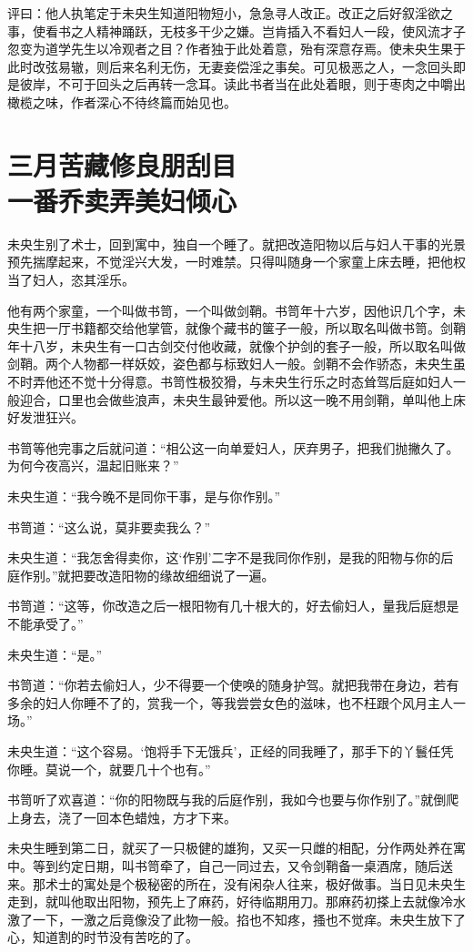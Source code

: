 \documentclass[a4paper,12pt,UTF8,twoside]{ctexbook}
\begin{document}
评曰：他人执笔定于未央生知道阳物短小，急急寻人改正。改正之后好叙淫欲之事，使看书之人精神踊跃，无枝多干少之嫌。岂肯插入不看妇人一段，使风流才子忽变为道学先生以冷观者之目？作者独于此处着意，殆有深意存焉。使未央生果于此时改弦易辙，则后来名利无伤，无妻妾偿淫之事矣。可见极恶之人，一念回头即是彼岸，不可于回头之后再转一念耳。读此书者当在此处着眼，则于枣肉之中嚼出橄榄之味，作者深心不待终篇而始见也。

\chapter[三月苦藏修良朋刮目\ 一番乔卖弄美妇倾心]{三月苦藏修良朋刮目\\一番乔卖弄美妇倾心}

未央生别了术士，回到寓中，独自一个睡了。就把改造阳物以后与妇人干事的光景预先揣摩起来，不觉淫兴大发，一时难禁。只得叫随身一个家童上床去睡，把他权当了妇人，恣其淫乐。

他有两个家童，一个叫做书笥，一个叫做剑鞘。书笥年十六岁，因他识几个字，未央生把一厅书籍都交给他掌管，就像个藏书的箧子一般，所以取名叫做书笥。剑鞘年十八岁，未央生有一口古剑交付他收藏，就像个护剑的套子一般，所以取名叫做剑鞘。两个人物都一样妖姣，姿色都与标致妇人一般。剑鞘不会作骄态，未央生虽不时弄他还不觉十分得意。书笥性极狡猾，与未央生行乐之时态耸驾后庭如妇人一般迎合，口里也会做些浪声，未央生最钟爱他。所以这一晚不用剑鞘，单叫他上床好发泄狂兴。

书笥等他完事之后就问道：“相公这一向单爱妇人，厌弃男子，把我们抛撇久了。为何今夜高兴，温起旧账来？”

未央生道：“我今晚不是同你干事，是与你作别。”

书笥道：“这么说，莫非要卖我么？”

未央生道：“我怎舍得卖你，这‘作别’二字不是我同你作别，是我的阳物与你的后庭作别。”就把要改造阳物的缘故细细说了一遍。

书笥道：“这等，你改造之后一根阳物有几十根大的，好去偷妇人，量我后庭想是不能承受了。”

未央生道：“是。”

书笥道：“你若去偷妇人，少不得要一个使唤的随身护驾。就把我带在身边，若有多余的妇人你睡不了的，赏我一个，等我尝尝女色的滋味，也不枉跟个风月主人一场。”

未央生道：“这个容易。‘饱将手下无饿兵’，正经的同我睡了，那手下的丫鬟任凭你睡。莫说一个，就要几十个也有。”

书笥听了欢喜道：“你的阳物既与我的后庭作别，我如今也要与你作别了。”就倒爬上身去，浇了一回本色蜡烛，方才下来。

未央生睡到第二日，就买了一只极健的雄狗，又买一只雌的相配，分作两处养在寓中。等到约定日期，叫书笥牵了，自己一同过去，又令剑鞘备一桌酒席，随后送来。那术士的寓处是个极秘密的所在，没有闲杂人往来，极好做事。当日见未央生走到，就叫他取出阳物，预先上了麻药，好待临期用刀。那麻药初搽上去就像冷水激了一下，一激之后竟像没了此物一般。掐也不知疼，搔也不觉痒。未央生放下了心，知道割的时节没有苦吃的了。
\end{document}
